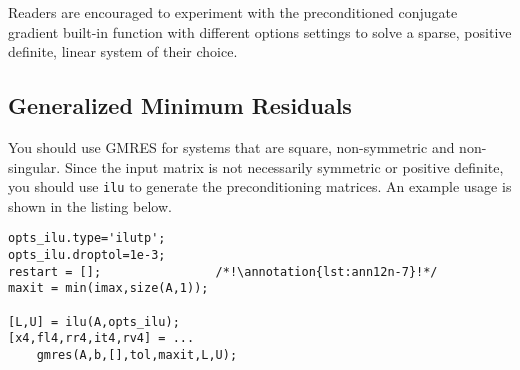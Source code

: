 Readers are encouraged to experiment with the preconditioned conjugate gradient built-in function with different options settings to solve a sparse, positive definite, linear system of their choice.

\subsection{Generalized Minimum Residuals}
You should use GMRES for systems that are square, non-symmetric and non-singular.  Since the input matrix is not necessarily symmetric or positive definite, you should use \lstinline[style=myMatlab]{ilu} to generate the preconditioning matrices.  An example usage is shown in the listing below.
\begin{lstlisting}[style=myMatlab]
%% GMRES with Incomplete LU Preconditioner
opts_ilu.type='ilutp';
opts_ilu.droptol=1e-3;
restart = [];                /*!\annotation{lst:ann12n-7}!*/
maxit = min(imax,size(A,1));

[L,U] = ilu(A,opts_ilu); 
[x4,fl4,rr4,it4,rv4] = ...
    gmres(A,b,[],tol,maxit,L,U);
\end{lstlisting}
